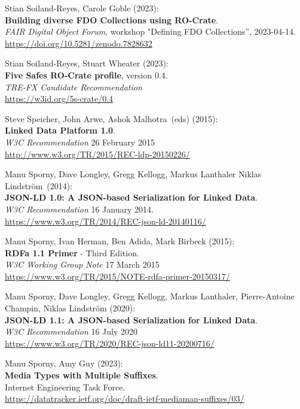 \begin{thebibliography}{9}
Stian Soiland-Reyes, Carole Goble (2023):\\
\textbf{Building diverse FDO Collections using RO-Crate}.\\
\emph{FAIR Digital Object Forum}, workshop "Defining FDO Collections”, 2023-04-14.\\
\url{https://doi.org/10.5281/zenodo.7828632}

Stian Soiland-Reyes, Stuart Wheater (2023):\\
\textbf{Five Safes RO-Crate profile}, version 0.4.\\
\emph{TRE-FX Candidate Recommendation} \\
\url{https://w3id.org/5s-crate/0.4}

Steve Speicher, John Arwe, Ashok Malhotra~(eds) (2015):\\
\textbf{Linked Data Platform 1.0}.\\ 
\emph{W3C Recommendation} 26 February 2015\\
\url{http://www.w3.org/TR/2015/REC-ldp-20150226/}

Manu Sporny, Dave Longley,  Gregg Kellogg,  Markus Lanthaler
Niklas Lindström~(2014):\\
\textbf{JSON-LD 1.0: A JSON-based Serialization for Linked Data}.\\
\emph{W3C Recommendation} 16 January 2014.\\
\url{https://www.w3.org/TR/2014/REC-json-ld-20140116/}

Manu Sporny, Ivan Herman, Ben Adida, Mark Birbeck (2015):\\
\textbf{RDFa 1.1 Primer} - Third Edition. \\
\emph{W3C Working Group Note} 17 March 2015 \\
\url{https://www.w3.org/TR/2015/NOTE-rdfa-primer-20150317/}

Manu Sporny, Dave Longley, Gregg Kellogg, Markus Lanthaler, Pierre-Antoine Champin, Niklas Lindström (2020):\\
\textbf{JSON-LD 1.1: A JSON-based Serialization for Linked Data}.\\
\emph{W3C Recommendation} 16 July 2020\\
\url{https://www.w3.org/TR/2020/REC-json-ld11-20200716/}

Manu Sporny, Amy Guy (2023): \\
\textbf{{Media Types with Multiple Suffixes}}.\\
Internet Engineering Task Force.\\
\url{https://datatracker.ietf.org/doc/draft-ietf-mediaman-suffixes/03/}
 

\end{thebibliography}
